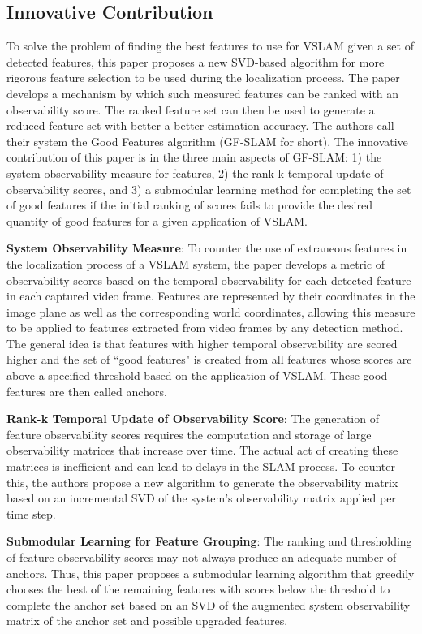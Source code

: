 \documentclass[10pt,twocolumn,letterpaper]{article}
\begin{document}
\subsection{Innovative Contribution}
To solve the problem of finding the best features to use for VSLAM given a set of detected features, 
this paper proposes a new SVD-based algorithm for more rigorous feature selection to be used 
during the localization process. The paper develops a mechanism by which such measured features 
can be ranked with an observability score. The ranked feature set can then be used to generate a 
reduced feature set with better a better estimation accuracy. The authors call their system the Good 
Features algorithm (GF-SLAM for short). The innovative contribution of this paper is in the three main 
aspects of GF-SLAM: 1) the system observability measure for features, 2) the rank-k temporal update 
of observability scores, and 3) a submodular learning method for completing the set of good features if 
the initial ranking of scores fails to provide the desired quantity of good features for a given application of 
VSLAM.

\textbf{System Observability Measure}: To counter the use of extraneous features in the localization process 
of a VSLAM system, the paper develops a metric of observability scores based on the temporal observability 
for each detected feature in each captured video frame. Features are represented by their coordinates in the 
image plane as well as the corresponding world coordinates, allowing this measure to be applied to features 
extracted from video frames by any detection method. The general idea is that features with higher temporal 
observability are scored higher and the set of ``good features" is created from all features whose scores are 
above a specified threshold based on the application of VSLAM. These good features are then called 
anchors.

\textbf{Rank-k Temporal Update of Observability Score}: The generation of feature observability 
scores requires 
the computation and storage of large observability matrices that increase over time. 
The actual act of creating these matrices is inefficient and can lead to delays 
in the SLAM process. To counter this, the authors propose a new algorithm to generate the 
observability matrix 
based on an incremental SVD of the system's observability matrix applied per time step.

\textbf{Submodular Learning for Feature Grouping}: The ranking and thresholding of feature 
observability scores may not 
always produce an adequate number of anchors. 
Thus, this paper proposes a submodular learning algorithm that 
greedily chooses the best of the remaining features with scores 
below the threshold to complete the anchor set based on an 
SVD of the augmented system observability matrix of the anchor set and possible upgraded features. 
\end{document}
